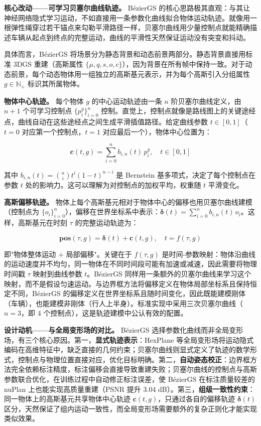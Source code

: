 \textbf{核心改动——可学习贝塞尔曲线轨迹。} B\'ezierGS 的核心思路极其直观：与其让神经网络隐式学习运动，不如直接用一条参数化曲线拟合物体运动轨迹。就像用一根弹性绳穿过若干锚点来勾勒平滑路径一样，贝塞尔曲线用少量控制点就能精确描述车辆从起点到终点的完整运动，曲线的平滑性天然保证运动没有突变和抖动。

具体而言，B\'ezierGS 将场景分为静态背景和动态前景两部分。静态背景直接用标准 3DGS 重建（高斯属性 $\{\mu, q, s, o, c\}$），因为背景在所有帧中保持一致。对于动态前景，每个动态物体用一组独立的高斯基元表示，并为每个高斯引入分组属性 $g \in \mathbb{N}_+$ 标识其所属物体。

\textbf{物体中心轨迹。} 每个物体 $g$ 的中心运动轨迹由一条 $n$ 阶贝塞尔曲线定义，由 $n+1$ 个可学习控制点 $\{p_i^g\}_{i=0}^n$ 控制。直觉上，控制点就像是路线图上的关键途经点，曲线自动在这些途经点之间生成平滑插值路径。给定曲线参数 $t \in [0,1]$（$t=0$ 对应第一个控制点，$t=1$ 对应最后一个），物体中心位置为：

\begin{equation}
\mathbf{c}(t, g) = \sum_{i=0}^{n} b_{i,n}(t) \, p_i^g, \quad t \in [0,1]
\end{equation}

其中 $b_{i,n}(t) = \binom{n}{i} t^i (1-t)^{n-i}$ 是 Bernstein 基多项式，决定了每个控制点在参数 $t$ 处的影响力。这可以理解为对控制点的加权平均，权重随 $t$ 平滑变化。

\textbf{高斯偏移轨迹。} 物体上每个高斯基元相对于物体中心的偏移也用贝塞尔曲线建模（控制点为 $\{o_i\}_{i=0}^n$），偏移在世界坐标系中表示：$\boldsymbol{\delta}(t) = \sum_{i=0}^{n} b_{i,n}(t) \, o_i$。这样，高斯基元在时刻 $\tau$ 的完整运动轨迹为：

\begin{equation}
\mathbf{pos}(\tau, g) = \boldsymbol{\delta}(t) + \mathbf{c}(t, g), \quad t = f(\tau, g)
\end{equation}

即"物体整体运动 $+$ 局部偏移"。关键在于 $f(\tau, g)$ 是时间-参数映射：物体沿曲线的运动速度并不均匀，同一物体在不同时间段可能有加速或减速，因此需要将物理时间戳 $\tau$ 映射到曲线参数 $t$。B\'ezierGS 同样用一条额外的贝塞尔曲线来学习这个映射，而不是假设匀速运动。与边界框方法将偏移定义在物体局部坐标系且保持恒定不同，B\'ezierGS 的偏移定义在世界坐标系且随时间变化，因此既能建模刚体（车辆），也能建模非刚体（行人上半身）。标准实现中采用三次贝塞尔曲线（$n=3$，即 4 个控制点），这是轨迹建模中公认有效的配置。

\textbf{设计动机——与全局变形场的对比。} B\'ezierGS 选择参数化曲线而非全局变形场，有三个核心原因。第一，\textbf{显式轨迹表示}：HexPlane 等全局变形场将运动隐式编码在高维特征中，缺乏直接的几何约束；贝塞尔曲线则显式定义了轨迹的数学形式，控制点与物理位置直接对应，优化目标明确。第二，\textbf{自动姿态校正}：边界框方法完全依赖标注精度，标注偏移会直接导致重建失败；贝塞尔曲线的控制点与高斯参数联合优化，在训练过程中自动修正标注误差，使 B\'ezierGS 在标注质量较差的 nuPlan 上也能实现高质量重建（PSNR 提升 3.04 dB）。第三，\textbf{组级一致性约束}：同一物体上的高斯基元共享物体中心轨迹 $\mathbf{c}(t,g)$，只通过各自的偏移轨迹 $\boldsymbol{\delta}(t)$ 区分，天然保证了组内运动一致性，而全局变形场需要额外的复杂正则化才能实现类似效果。

